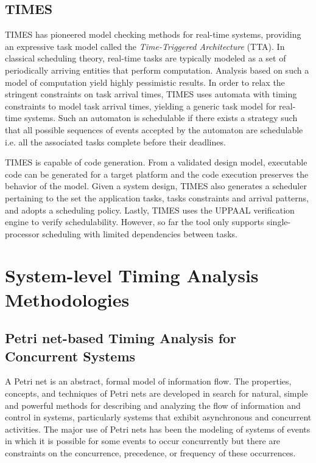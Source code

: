\subsection{TIMES}

TIMES \cite{TIMES} has pioneered model checking methods for real-time systems, providing an expressive task model called the \emph{Time-Triggered Architecture} (TTA). In classical scheduling theory, real-time tasks are typically modeled as a set of periodically arriving entities that perform computation. Analysis based on such a model of computation yield highly pessimistic results. In order to relax the stringent constraints on task arrival times, TIMES uses automata with timing constraints to model task arrival times, yielding a generic task model for real-time systems. Such an automaton is schedulable if there exists a strategy such that all possible sequences of events accepted by the automaton are schedulable i.e. all the associated tasks complete before their deadlines. 

TIMES is capable of code generation. From a validated design model, executable code can be generated for a target platform and the code execution preserves the behavior of the model. Given a system design, TIMES also generates a scheduler pertaining to the set the application tasks, tasks constraints and arrival patterns, and adopts a scheduling policy. Lastly, TIMES uses the UPPAAL verification engine to verify schedulability. However, so far the tool only supports single-processor scheduling with limited dependencies between tasks. 

\section{System-level Timing Analysis Methodologies}

\subsection{Petri net-based Timing Analysis for Concurrent Systems}

A Petri net \cite{peterson1977petri} is an abstract, formal model of information flow. The properties, concepts, and techniques of Petri nets are developed in search for natural, simple and powerful methods for describing and analyzing the flow of information and control in systems, particularly systems that exhibit asynchronous and concurrent activities. The major use of Petri nets has been the modeling of systems of events in which it is possible for some events to occur concurrently but there are constraints on the concurrence, precedence, or frequency of these occurrences. 

